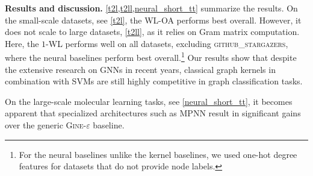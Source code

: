 \documentclass{article}
\newcommand{\xhdr}[1]{{\noindent\bfseries #1}}
\theoremstyle{definition}
\begin{document}
\xhdr{Results and discussion.}
\cref{t2l,t2ll,neural_short_tt} summarize the results. On the small-scale datasets, see \cref{t2l}, the \textsc{WL-OA} performs best overall. However, it does not scale to large datasets, \cref{t2ll}, as it relies on Gram matrix computation. Here, the $1$-WL performs well on all datasets, excluding \textsc{github\_stargazers}, where the neural baselines perform best overall.\footnote{For the neural baselines unlike the kernel baselines, we used one-hot degree features for datasets that do not provide node labels.}
Our results show that despite the extensive research on GNNs in recent years, classical graph kernels in combination with SVMs are still highly competitive in graph classification tasks.
\begin{table}[]\centering	
	\caption{Mean MAE (mean std. MAE, logMAE) on large-scale (multi-target) molecular regression tasks.\label{neural_short_tt}}
\end{table}		
On the large-scale molecular learning tasks, see \cref{neural_short_tt}, it becomes apparent that specialized architectures such as \textsc{MPNN} result in significant gains over the generic \textsc{Gine-$\varepsilon$} baseline. 
\end{document}
